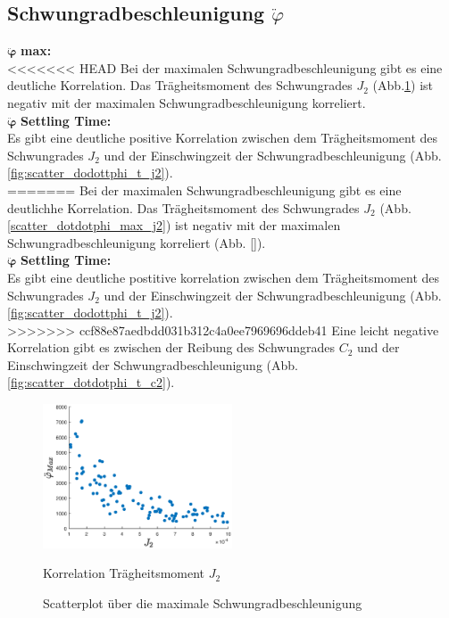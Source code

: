 \subsection*{Schwungradbeschleunigung $\ddot\varphi$}
$\bm{\ddot\varphi}$ \textbf{max: }\\
<<<<<<< HEAD
Bei der maximalen Schwungradbeschleunigung gibt es eine deutliche Korrelation.
Das Trägheitsmoment des Schwungrades $J_2$ (Abb.\ref{fig:scatter_dotdotphi_max_j2}) ist negativ mit der maximalen Schwungradbeschleunigung korreliert.\\

$\bm{\ddot\varphi}$ \textbf{Settling Time: }\\
Es gibt eine deutliche positive Korrelation zwischen dem Trägheitsmoment des Schwungrades $J_2$ und der Einschwingzeit der Schwungradbeschleunigung (Abb. \ref{fig:scatter_dodottphi_t_j2}).\\
=======
Bei der maximalen Schwungradbeschleunigung gibt es eine deutlichhe Korrelation.
Das Trägheitsmoment des Schwungrades $J_2$ (Abb.\ref{scatter_dotdotphi_max_j2}) ist negativ mit der maximalen Schwungradbeschleunigung korreliert (Abb. \ref{}).\\

$\bm{\ddot\varphi}$ \textbf{Settling Time: }\\
Es gibt eine deutliche postitive korrelation zwischen dem Trägheitsmoment des Schwungrades $J_2$ und der Einschwingzeit der Schwungradbeschleunigung (Abb. \ref{fig:scatter_dodottphi_t_j2}).\\
>>>>>>> ccf88e87aedbdd031b312c4a0ee7969696ddeb41
Eine leicht negative Korrelation gibt es zwischen der Reibung des Schwungrades $C_2$ und der Einschwingzeit der Schwungradbeschleunigung (Abb. \ref{fig:scatter_dotdotphi_t_c2}).\\
\begin{figure}
    \centering
        \centering
        \includegraphics[width=0.5\textwidth]{Bilder/5_sensi/cm/dotdot_phi_max_J2.eps}
        \caption{Korrelation Trägheitsmoment $J_2$}
        \label{fig:scatter_dotdotphi_max_j2}
    \caption{Scatterplot über die maximale Schwungradbeschleunigung}
\end{figure}

